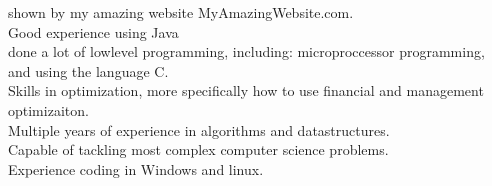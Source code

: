 shown by my amazing website MyAmazingWebsite.com.\\Good experience using Java\\done a lot of lowlevel programming, including: microproccessor programming, and using the language C.\\Skills in optimization, more specifically how to use financial and management optimizaiton.\\Multiple years of experience in algorithms and datastructures.\\Capable of tackling most complex computer science problems.\\Experience coding in Windows and linux.\\
